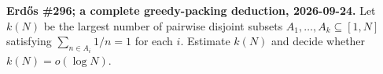 \textbf{Erd\H{o}s \#296; a complete greedy-packing deduction, 2026-09-24.}
Let $k(N)$ be the largest number of pairwise disjoint subsets $A_1,\ldots,A_k\subseteq[1,N]$ satisfying $\sum_{n\in A_i}1/n=1$ for each $i$. Estimate $k(N)$ and decide whether $k(N)=o(\log N)$.
